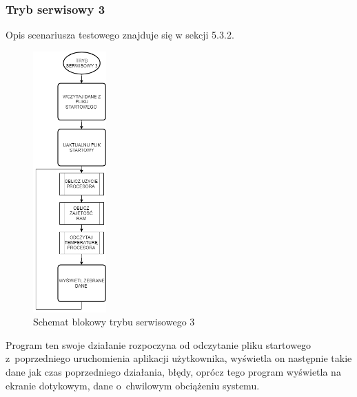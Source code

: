 \documentclass[12pt, eng, twoside, openany, final]{mgr}
\begin{document}
                    \subsubsection{Tryb serwisowy 3}
                    Opis scenariusza testowego znajduje się w sekcji 5.3.2.
                        \begin{figure}[H]
                        \begin{center}
                            \includegraphics[width=0.25\textwidth]{t3.png}
                            \caption{Schemat blokowy trybu serwisowego 3} \label{fig:serT3}
                        \end{center}
                        \end{figure}
                        \noindent Program ten swoje działanie rozpoczyna od odczytanie pliku startowego z~poprzedniego uruchomienia aplikacji użytkownika, wyświetla on następnie takie dane jak czas poprzedniego działania, błędy, oprócz tego program wyświetla na ekranie dotykowym, dane o~chwilowym obciążeniu systemu.
                    
                        \newpage
\end{document}
